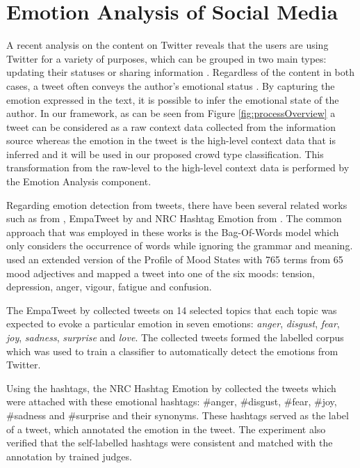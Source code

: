 \section{Emotion Analysis of Social Media}

A recent analysis on the content on Twitter reveals that the users are using Twitter for a variety of purposes, which can be grouped in two main types: updating their statuses or sharing information \citep{java2007we}. Regardless of the content in both cases, a tweet often conveys the author's emotional status \citep{bollen2009modeling}. By capturing the emotion expressed in the text, it is possible to infer the emotional state of the author. In our framework, as can be seen from Figure \ref{fig:processOverview} a tweet can be considered as a raw context data collected from the information source whereas the emotion in the tweet is the high-level context data that is inferred and it will be used in our proposed crowd type classification. This transformation from the raw-level to the high-level context data is performed by the Emotion Analysis component.

Regarding emotion detection from tweets, there have been several related works such as from \citet{bollen2009modeling}, EmpaTweet by \citet{roberts2012empatweet} and NRC Hashtag Emotion from \citet{mohammad2014using}. The common approach that was employed in these works is the Bag-Of-Words model which only considers the occurrence of words while ignoring the grammar and meaning. \citet{bollen2009modeling} used an extended version of the Profile of Mood States with 765 terms from 65 mood adjectives and mapped a tweet into one of the six moods: tension, depression, anger, vigour, fatigue and confusion.

The EmpaTweet by \citet{roberts2012empatweet} collected tweets on 14 selected topics that each topic was expected to evoke a particular emotion in seven emotions: \textit{anger}, \textit{disgust}, \textit{fear}, \textit{joy}, \textit{sadness}, \textit{surprise} and \textit{love}. The collected tweets formed the labelled corpus which was used to train a classifier to automatically detect the emotions from Twitter.

Using the hashtags, the NRC Hashtag Emotion by \citet{mohammad2014using} collected the tweets which were attached with these emotional hashtags: \#anger, \#disgust, \#fear, \#joy, \#sadness and \#surprise and their synonyms. These hashtags served as the label of a tweet, which annotated the emotion in the tweet. The experiment also verified that the self-labelled hashtags were consistent and matched with the annotation by trained judges. 


